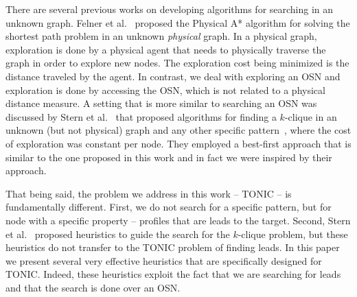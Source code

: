 \documentclass[journal]{IEEEtran}
\begin{document}

There are several previous works on developing algorithms for searching in an unknown graph. Felner et al.~ proposed the Physical A* algorithm for solving the shortest path problem in an unknown {\em physical} graph. In a physical graph, exploration is done by a physical agent that needs to physically traverse the graph in order to explore new nodes. The exploration cost being minimized is the distance traveled by the agent. 
In contrast, we deal with exploring an OSN and exploration is done by accessing the OSN, which is not related to a physical distance measure. A setting that is more similar to searching an OSN was discussed by Stern et al.~ that proposed algorithms for finding a $k$-clique in an unknown (but not physical) graph and any other specific pattern~\cite{stern2012findingPatterns}, where the cost of exploration was constant per node. They employed a best-first approach that is similar to the one proposed in this work and in fact we were inspired by their approach.

That being said, the problem we address in this work -- TONIC -- is  fundamentally different. First, we do not search for a specific pattern, but for node with a specific property -- profiles that are leads to the target. 
Second, Stern et al.~ proposed heuristics to guide the search for the $k$-clique problem, but these heuristics do not transfer to the TONIC problem of finding leads. In this paper we present several very effective heuristics that are specifically designed for TONIC. Indeed, these heuristics exploit the fact that we are searching for leads and that the search is done over an OSN. 

\end{document}
